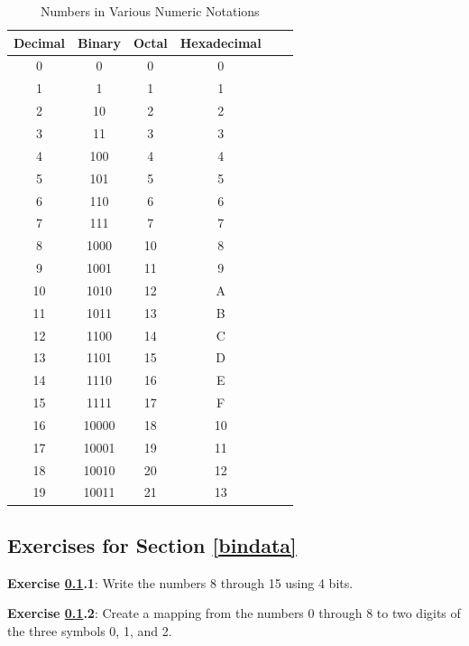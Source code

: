 \documentclass{book}
\begin{document}
\begin{table}[h!]
\centering
\begin{tabular}{||c|c|c|c|c|c||}
    \hline
    Decimal & Binary & Octal & Hexadecimal\\
    \hline\hline
     0 & 0 & 0 & 0\\
     \hline
     1 & 1 & 1 & 1\\
     \hline
     2 & 10 & 2 & 2\\
     \hline
     3 & 11 & 3 & 3\\
     \hline
     4 & 100 & 4 & 4\\
     \hline
     5 & 101 & 5 & 5\\
     \hline
     6 & 110 & 6 & 6\\
     \hline
     7 & 111 & 7 & 7\\
     \hline
     8 & 1000 & 10 & 8\\
     \hline
     9 & 1001 & 11 & 9\\
     \hline
     10 & 1010 & 12 & A\\
     \hline
     11 & 1011 & 13 & B\\
     \hline
     12 & 1100 & 14 & C\\
     \hline
     13 & 1101 & 15 & D\\
     \hline
     14 & 1110 & 16 & E\\
     \hline
     15 & 1111 & 17 & F\\
     \hline
     16 & 10000 & 18 & 10\\
     \hline
     17 & 10001 & 19 & 11\\
     \hline
     18 & 10010 & 20 & 12\\
     \hline
     19 & 10011 & 21 & 13\\
     \hline
\end{tabular}
\caption{Numbers in Various Numeric Notations}
\end{table}



\subsection{Exercises for Section \ref{bindata}}\label{ex.bindata}

\noindent\textbf{Exercise \ref{ex.bindata}.1}: Write the numbers 8 through 15
using 4 bits.

\medskip\noindent
\textbf{Exercise \ref{ex.bindata}.2}: Create a mapping from the numbers 0
through 8 to two digits of the three symbols 0, 1, and 2.
\end{document}
